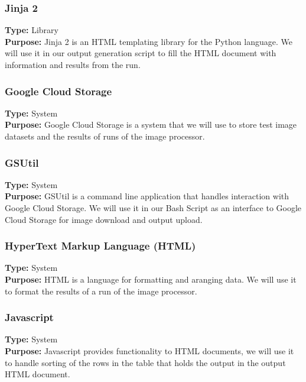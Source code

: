 \documentclass[10pt, onecolumn, draftclsnofoot, letterpaper, compsoc]{IEEEtran}
\begin{document}
    \subsubsection{Jinja 2}
    \textbf{Type:} Library \\
    \textbf{Purpose:} Jinja 2 is an HTML templating library for the Python
    language. We will use it in our output generation script to fill the HTML
    document with information and results from the run. \\

    \subsubsection{Google Cloud Storage}
    \textbf{Type:} System \\
    \textbf{Purpose:} Google Cloud Storage is a system that we will use to store
    test image datasets and the results of runs of the image processor. \\

    \subsubsection{GSUtil}
    \textbf{Type:} System \\
    \textbf{Purpose:} GSUtil is a command line application that handles
    interaction with Google Cloud Storage. We will use it in our Bash Script as
    an interface to Google Cloud Storage for image download and output upload. \\

    \subsubsection{HyperText Markup Language (HTML)}
    \textbf{Type:} System \\
    \textbf{Purpose:} HTML is a language for formatting and aranging data. We
    will use it to format the results of a run of the image processor. \\

    \subsubsection{Javascript}
    \textbf{Type:} System \\
    \textbf{Purpose:} Javascript provides functionality to HTML documents, we
    will use it to handle sorting of the rows in the table that holds the
    output in the output HTML document. \\
\end{document}
